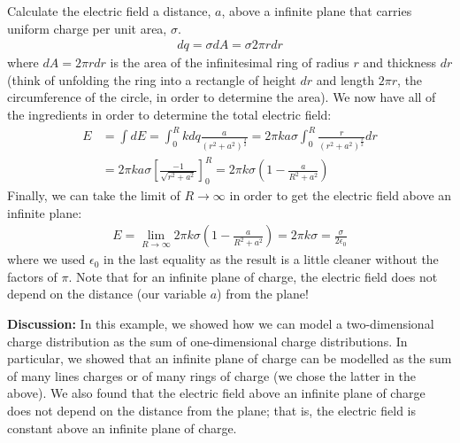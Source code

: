 \begin{example}{Calculate the electric field a distance, $a$, above a infinite plane that carries uniform charge per unit area, $\sigma$.}
\begin{align*}
dq = \sigma dA=\sigma 2\pi r dr
\end{align*}
where $dA=2\pi r dr$ is the area of the infinitesimal ring of radius $r$ and thickness $dr$ (think of unfolding the ring into a rectangle of height $dr$ and length $2\pi r$, the circumference of the circle, in order to determine the area). We now have all of the ingredients in order to determine the total electric field:
\begin{align*}
E &= \int dE = \int_0^R kdq\frac{a}{(r^2+a^2)^\frac{3}{2}}  = 2\pi k a \sigma \int_0^R \frac{r}{(r^2+a^2)^\frac{3}{2}}dr\\
&=2\pi k a \sigma \left[  \frac{-1}{\sqrt{r^2+a^2}}\right]_0^R=2\pi k  \sigma\left(1-\frac{a}{R^2+a^2} \right)
\end{align*}
Finally, we can take the limit of $R\to\infty$ in order to get the electric field above an infinite plane:
\begin{align*}
E=\lim_{R\to\infty}2\pi k  \sigma\left(1-\frac{a}{R^2+a^2} \right)=2\pi k\sigma=\frac{\sigma}{2\epsilon_0}
\end{align*}
where we used $\epsilon_0$ in the last equality as the result is a little cleaner without the factors of $\pi$. Note that for an infinite plane of charge, the electric field does not depend on the distance (our variable $a$) from the plane!

\textbf{Discussion:} In this example, we showed how we can model a two-dimensional charge distribution as the sum of one-dimensional charge distributions. In particular, we showed that an infinite plane of charge can be modelled as the sum of many lines charges or of many rings of charge (we chose the latter in the above). We also found that the electric field above an infinite plane of charge does not depend on the distance from the plane; that is, the electric field is constant above an infinite plane of charge. 
\end{example}
